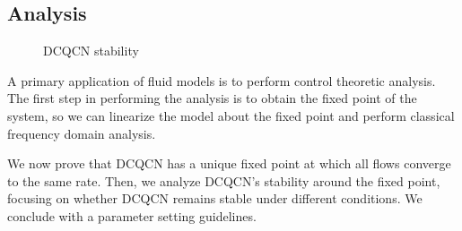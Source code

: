 \subsection{Analysis}
\label{sec:dcqcn_stability}

\begin{figure}[t]
\caption{DCQCN stability}
\label{fig:dcqcn_stability}
\end{figure}

A primary application of fluid models is to perform control theoretic analysis.
The first step in performing the analysis is to obtain the fixed point of the
system, so we can linearize the model about the fixed point and perform
classical frequency domain analysis. 

We now prove that DCQCN has a unique fixed point at which all flows converge to
the same rate. Then, we analyze DCQCN's stability around the fixed point,
focusing on whether DCQCN remains stable under different conditions. We conclude
with a parameter setting guidelines.

